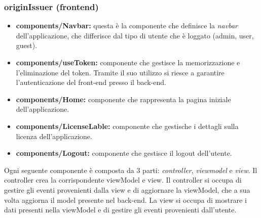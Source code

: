 \subsubsection{originIssuer (frontend)} 
\begin{itemize}
    \item \textbf{components/Navbar:} questa è la componente che definisce la \textit{navbar} dell'applicazione, che differisce dal tipo di utente che è loggato (admin, user, guest).
    \item \textbf{components/useToken:} componente che gestisce la memorizzazione e l'eliminazione del token. Tramite il suo utilizzo si riesce a garantire l'autenticazione del front-end presso il back-end.
    \item \textbf{components/Home:} componente che rappresenta la pagina iniziale dell'applicazione.
    \item \textbf{components/LicenseLable:} componente che gestische i dettagli sulla licenza dell'applicazione.
    \item \textbf{components/Logout:} componente che gestisce il logout dell'utente.
\end{itemize}

Ogni seguente componente è composta da 3 parti: \textit{controller}, \textit{viewmodel} e \textit{view}. Il controller crea la corrispondente
viewModel e view. Il controller si occupa di gestire gli eventi provenienti dalla view e di aggiornare la viewModel, che a sua volta aggiorna 
il model presente nel back-end. La view si occupa di mostrare i dati presenti nella viewModel e di gestire gli eventi provenienti dall'utente.

